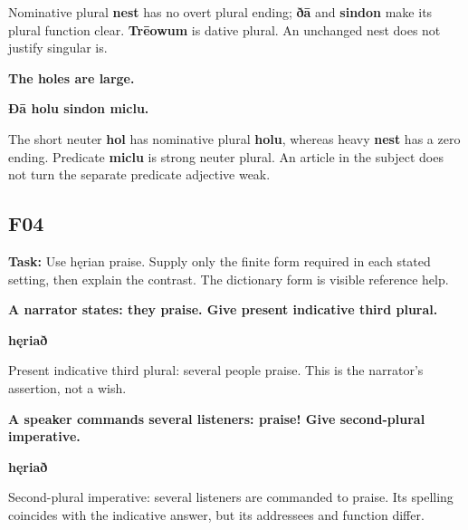 Nominative plural \textbf{nest} has no overt plural ending; \textbf{ðā} and \textbf{sindon} make its plural function clear. \textbf{Trēowum} is dative plural. An unchanged nest does not justify singular is.

\textbf{The holes are large.}

\textbf{Ðā holu sindon miclu.}

The short neuter \textbf{hol} has nominative plural \textbf{holu}, whereas heavy \textbf{nest} has a zero ending. Predicate \textbf{miclu} is strong neuter plural. An article in the subject does not turn the separate predicate adjective weak.

\subsection*{F04}

\textbf{Task:} Use hęrian praise. Supply only the finite form required in each stated setting, then explain the contrast. The dictionary form is visible reference help.

\textbf{A narrator states: they praise. Give present indicative third plural.}

\textbf{hęriað}

Present indicative third plural: several people praise. This is the narrator's assertion, not a wish.

\par\begin{minipage}{\linewidth}\raggedright
\textbf{A speaker commands several listeners: praise! Give second-plural imperative.}

\textbf{hęriað}

Second-plural imperative: several listeners are commanded to praise. Its spelling coincides with the indicative answer, but its addressees and function differ.
\end{minipage}\par


